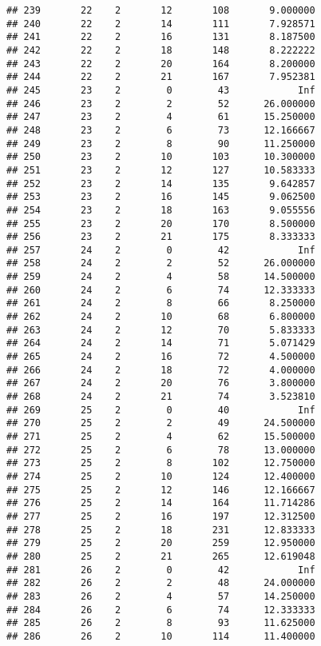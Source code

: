 \documentclass[
]{article}
\begin{document}
\begin{verbatim}
## 239       22    2       12       108       9.000000
## 240       22    2       14       111       7.928571
## 241       22    2       16       131       8.187500
## 242       22    2       18       148       8.222222
## 243       22    2       20       164       8.200000
## 244       22    2       21       167       7.952381
## 245       23    2        0        43            Inf
## 246       23    2        2        52      26.000000
## 247       23    2        4        61      15.250000
## 248       23    2        6        73      12.166667
## 249       23    2        8        90      11.250000
## 250       23    2       10       103      10.300000
## 251       23    2       12       127      10.583333
## 252       23    2       14       135       9.642857
## 253       23    2       16       145       9.062500
## 254       23    2       18       163       9.055556
## 255       23    2       20       170       8.500000
## 256       23    2       21       175       8.333333
## 257       24    2        0        42            Inf
## 258       24    2        2        52      26.000000
## 259       24    2        4        58      14.500000
## 260       24    2        6        74      12.333333
## 261       24    2        8        66       8.250000
## 262       24    2       10        68       6.800000
## 263       24    2       12        70       5.833333
## 264       24    2       14        71       5.071429
## 265       24    2       16        72       4.500000
## 266       24    2       18        72       4.000000
## 267       24    2       20        76       3.800000
## 268       24    2       21        74       3.523810
## 269       25    2        0        40            Inf
## 270       25    2        2        49      24.500000
## 271       25    2        4        62      15.500000
## 272       25    2        6        78      13.000000
## 273       25    2        8       102      12.750000
## 274       25    2       10       124      12.400000
## 275       25    2       12       146      12.166667
## 276       25    2       14       164      11.714286
## 277       25    2       16       197      12.312500
## 278       25    2       18       231      12.833333
## 279       25    2       20       259      12.950000
## 280       25    2       21       265      12.619048
## 281       26    2        0        42            Inf
## 282       26    2        2        48      24.000000
## 283       26    2        4        57      14.250000
## 284       26    2        6        74      12.333333
## 285       26    2        8        93      11.625000
## 286       26    2       10       114      11.400000

\end{verbatim}
\end{document}
